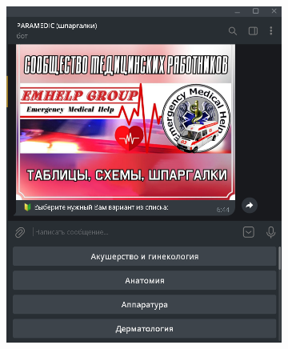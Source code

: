 \begin{figure}
  \begin{subfigure}[t]{0.1\linewidth}
    \centering
    \includegraphics[scale=0.4]{src/exbot1.png}
    \caption{}
  \end{subfigure}
  \hfill
  \begin{subfigure}[t]{0.5\linewidth}
    \centering

\end{subfigure}
\end{figure}
